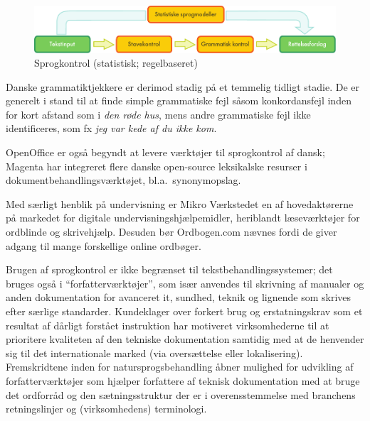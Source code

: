 \begin{multicols}{2}
\begin{figure}[htb]
  \center
  \includegraphics[width=\textwidth]{../_media/danish/language_checking}
  \caption{Sprogkontrol (statistisk; regelbaseret)}
  \label{fig:langcheckingaarch_de}
\end{figure}

Danske grammatiktjekkere er derimod stadig \mbox{p\aa} et temmelig tidligt stadie. De er generelt i stand til at finde simple grammatiske fejl s\aa som konkordansfejl inden for kort afstand som i {\it *den r\o de hus}, mens andre grammatiske fejl ikke identificeres, som fx {\it *jeg var kede af du ikke kom}.

OpenOffice er \mbox{ogs\aa} begyndt at levere v\ae rkt\o jer til sprogkontrol af dansk; Magenta  har integreret flere danske open-source leksikalske resurser i dokumentbehandlingsv\ae rkt\o jet, bl.a.\ synonymopslag.

Med s\ae rligt henblik \mbox{p\aa} undervisning er Mikro V\ae rkstedet en af hovedakt\o rerne \mbox{p\aa} markedet for digitale undervisningshj\ae lpemidler, heriblandt l\ae sev\ae rkt\o jer for ordblinde og skrivehj\ae lp. Desuden b\o r Ordbogen.com n\ae vnes fordi de giver adgang til mange forskellige online ordb\o ger. 

Brugen af sprogkontrol er ikke begr\ae nset til tekstbehandlingssystemer; det bruges \mbox{ogs\aa} i ``forfatterv\ae rkt\o jer'', som is\ae r anvendes til skrivning af manualer og anden dokumentation for avanceret it, sundhed, teknik og lignende som skrives efter s\ae rlige standarder. Kundeklager over forkert brug og erstatningskrav som et resultat af d\aa rligt forst\aa et instruktion har motiveret virksomhederne til at prioritere kvaliteten af den tekniske dokumentation samtidig med at de henvender sig til det internationale marked (via overs\ae ttelse eller lokalise\-ring). Fremskridtene inden for natursprogsbehandling \aa bner mulighed for udvikling af forfatterv\ae rkt\o jer som hj\ae lper forfattere af teknisk dokumentation med at bruge det ordforr\aa d og den s\ae tningsstruktur der er i overensstemmelse med branchens retningslinjer og (virksomhedens) terminologi.



\end{multicols}
